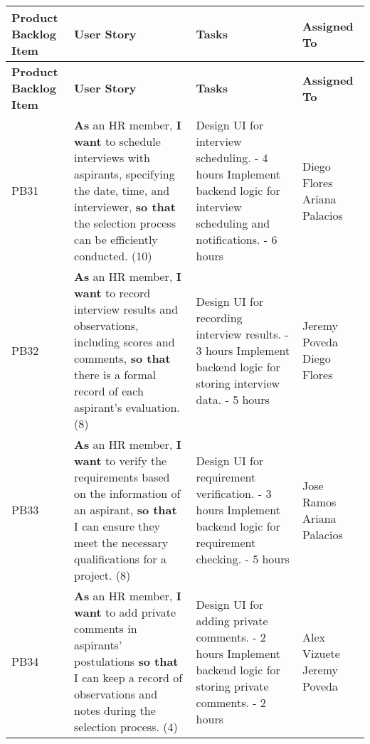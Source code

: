\documentclass{scrreprt}
\begin{document}
\begin{longtable}{|p{1.5cm}|p{5.5cm}|p{4.5cm}|p{3cm}|} \hline
	\textbf{Product Backlog Item} & \textbf{User Story} & \textbf{Tasks} & \textbf{Assigned To} \\ \hline
	\endfirsthead
	\hline
	\textbf{Product Backlog Item} & \textbf{User Story} & \textbf{Tasks} & \textbf{Assigned To} \\ \hline
	\endhead
	
	PB31 & \textbf{As} an HR member, \textbf{I want} to schedule interviews with aspirants, specifying the date, time, and interviewer, \textbf{so that} the selection process can be efficiently conducted. (10) &
	
	Design UI for interview scheduling. - 4 hours \newline
	Implement backend logic for interview scheduling and notifications. - 6 hours &
	Diego Flores \newline
	Ariana Palacios \\ \hline
	
	PB32 & \textbf{As} an HR member, \textbf{I want} to record interview results and observations, including scores and comments, \textbf{so that} there is a formal record of each aspirant's evaluation. (8) &
	
	Design UI for recording interview results. - 3 hours \newline
	Implement backend logic for storing interview data. - 5 hours &
	Jeremy Poveda \newline
	Diego Flores \\ \hline
	
	PB33 & \textbf{As} an HR member, \textbf{I want} to verify the requirements based on the information of an aspirant, \textbf{so that} I can ensure they meet the necessary qualifications for a project. (8) &
	
	Design UI for requirement verification. - 3 hours \newline
	Implement backend logic for requirement checking. - 5 hours &
	Jose Ramos \newline
	Ariana Palacios \\ \hline
	
	PB34 & \textbf{As} an HR member, \textbf{I want} to add private comments in aspirants' postulations \textbf{so that} I can keep a record of observations and notes during the selection process. (4) &
	
	Design UI for adding private comments. - 2 hours \newline
	Implement backend logic for storing private comments. - 2 hours &
	Alex Vizuete \newline
	Jeremy Poveda \\ \hline
	

\end{longtable}
\end{document}
